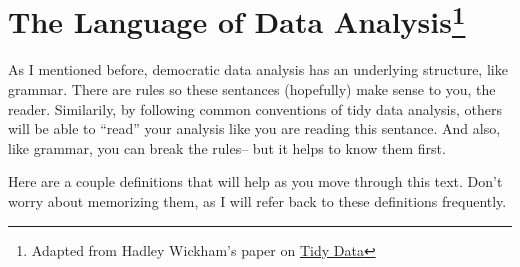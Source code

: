 \documentclass[]{book}
\begin{document}
\hypertarget{the-language-of-data-analysis}{%
\section[The Language of Data Analysis]{\texorpdfstring{The Language of Data Analysis\footnote{Adapted from Hadley Wickham's paper on \href{https://vita.had.co.nz/papers/tidy-data.pdf}{Tidy Data}}}{The Language of Data Analysis}}\label{the-language-of-data-analysis}}

As I mentioned before, democratic data analysis has an underlying structure, like grammar. There are rules so these sentances (hopefully) make sense to you, the reader. Similarily, by following common conventions of tidy data analysis, others will be able to ``read'' your analysis like you are reading this sentance. And also, like grammar, you can break the rules-- but it helps to know them first.

Here are a couple definitions that will help as you move through this text. Don't worry about memorizing them, as I will refer back to these definitions frequently.
\end{document}
